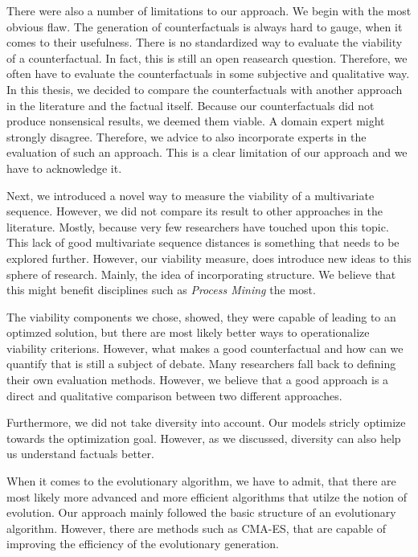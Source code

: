 \documentclass[./../../paper.tex]{subfiles}
\begin{document}
There were also a number of limitations to our approach. We begin with the most obvious flaw. The generation of counterfactuals is always hard to gauge, when it comes to their usefulness. There is no standardized way to evaluate the viability of a counterfactual. In fact, this is still an open reasearch question\autocites{hsieh_DiCE4ELInterpretingProcess_2021,mothilal_ExplainingMachineLearning_2020}. Therefore, we often have to evaluate the counterfactuals in some subjective and qualitative way. In this thesis, we decided to compare the counterfactuals with another approach in the literature and the factual itself. Because our counterfactuals did not produce nonsensical results, we deemed them viable. A domain expert might strongly disagree. Therefore, we advice to also incorporate experts in the evaluation of such an approach. This is a clear limitation of our approach and we have to acknowledge it. 

Next, we introduced a novel way to measure the viability of a multivariate sequence. However, we did not compare its result to other approaches in the literature. Mostly, because very few researchers have touched upon this topic. This lack of good multivariate sequence distances is something that needs to be explored further. However, our viability measure, does introduce new ideas to this sphere of research. Mainly, the idea of incorporating structure. We believe that this might benefit disciplines such as \emph{Process Mining} the most. 

The viability components we chose, showed, they were capable of leading to an optimzed solution, but there are most likely better ways to operationalize viability criterions. However, what makes a good counterfactual and how can we quantify that is still a subject of debate. Many researchers fall back to defining their own evaluation methods. However, we believe that a good approach is a direct and qualitative comparison between two different approaches.

Furthermore, we did not take diversity into account. Our models stricly optimize towards the optimization goal. However, as we discussed, diversity can also help us understand factuals better.

When it comes to the evolutionary algorithm, we have to admit, that there are most likely more advanced and more efficient algorithms that utilze the notion of evolution. Our approach mainly followed the basic structure of an evolutionary algorithm. However, there are methods such as CMA-ES, that are capable of improving the efficiency of the evolutionary generation. 
\end{document}
